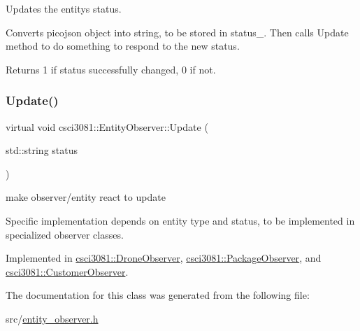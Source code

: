 Updates the entity\textquotesingle{}s status. 

Converts picojson object into string, to be stored in status\+\_\+. Then calls Update method to do something to respond to the new status.

\begin{DoxyReturn}{Returns}
1 if status successfully changed, 0 if not. 
\end{DoxyReturn}
\mbox{\label{classcsci3081_1_1EntityObserver_ad3188f03b6e68961ffcc415526795867}} 
\subsubsection{\texorpdfstring{Update()}{Update()}}
{\footnotesize\ttfamily virtual void csci3081\+::\+Entity\+Observer\+::\+Update (\begin{DoxyParamCaption}\item[{std\+::string}]{status }\end{DoxyParamCaption})\hspace{0.3cm}{\ttfamily [pure virtual]}}



make observer/entity react to update 

Specific implementation depends on entity type and status, to be implemented in specialized observer classes. 

Implemented in \hyperlink{classcsci3081_1_1DroneObserver_a54e1312bb116755bfa2b9a07c04632f7}{csci3081\+::\+Drone\+Observer}, \hyperlink{classcsci3081_1_1PackageObserver_a8ebc5b23b82ee2a2d0ec13872f24fb6c}{csci3081\+::\+Package\+Observer}, and \hyperlink{classcsci3081_1_1CustomerObserver_a2134ac33a6fd38951bbd979e6fd5a853}{csci3081\+::\+Customer\+Observer}.



The documentation for this class was generated from the following file\+:\begin{DoxyCompactItemize}
\item 
src/\hyperlink{entity__observer_8h}{entity\+\_\+observer.\+h}\end{DoxyCompactItemize}
